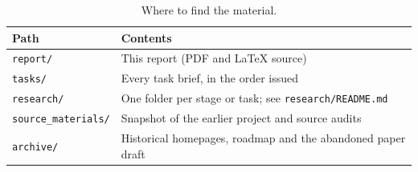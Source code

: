 \documentclass[11pt]{article}
\begin{document}
\begin{table}[H]
\centering
\scriptsize
\begin{tabular}{@{}L{2.4cm}L{4.4cm}@{}}
\toprule
\textbf{Path} & \textbf{Contents} \\
\midrule
\texttt{report/} & This report (PDF and LaTeX source) \\
\texttt{tasks/} & Every task brief, in the order issued \\
\texttt{research/} & One folder per stage or task; see \texttt{research/README.md} \\
\texttt{source\_materials/} & Snapshot of the earlier project and source audits \\
\texttt{archive/} & Historical homepages, roadmap and the abandoned paper draft \\
\bottomrule
\end{tabular}
\caption{Where to find the material.}
\end{table}
\end{document}
